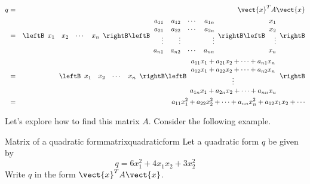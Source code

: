 \begin{eqnarray*}
q &=& \vect{x}^T A \vect{x} \\
&=& \leftB \begin{array}{rrrr}
x_1 & x_2 & \cdots & x_n
\end{array} \rightB 
 \leftB
\begin{array}{rrrr}
a_{11} & a_{12} & \cdots & a_{1n} \\
a_{21} & a_{22} & \cdots & a_{2n} \\
\vdots & \vdots & & \vdots \\
a_{n1} & a_{n2} & \cdots & a_{nn}
\end{array}
\rightB
\leftB \begin{array}{r}
x_1 \\
x_2 \\
\vdots \\
x_n 
\end{array}
\rightB \\
&=& 
\leftB \begin{array}{rrrr}
x_1 & x_2 & \cdots & x_n
\end{array} \rightB 
\leftB
\begin{array}{c}
a_{11}x_1 + a_{21}x_2 + \cdots + a_{n1}x_n \\
a_{12}x_1 + a_{22}x_2 + \cdots + a_{n2}x_n \\
\vdots \\
a_{1n}x_1 + a_{2n}x_2 + \cdots + a_{nn}x_n
\end{array}
\rightB \\
&=& a_{11}x_1^2 + a_{22}x_2^2 + \cdots + a_{nn}x_n^2 + a_{12}x_1x_2 + \cdots
\end{eqnarray*}

Let's explore how to find this matrix $A$. Consider the following example.

\begin{example}{Matrix of a quadratic form}{matrixquadraticform}
Let a quadratic form $q$ be given by 
\[
q = 6x_1^2 + 4x_1x_2 + 3x_2^2
\]
Write $q$ in the form $\vect{x}^TA\vect{x}$. 
\end{example}

